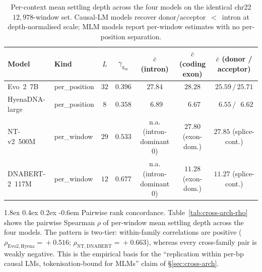 \documentclass{article}
\makeatletter
\renewcommand\paragraph{\@startsection{paragraph}{4}{\z@}%
  {1.8ex \@plus 0.4ex \@minus 0.2ex}%
  {-0.6em}%
{\normalfont\normalsize\bfseries}}
\theoremstyle{plain}
\theoremstyle{definition}
\theoremstyle{remark}
\makeatother
\begin{document}
\begin{table}[!htbp]
  \caption{Per-context mean settling depth across the four models on the
    identical chr22 $12{,}978$-window set. Causal-LM models recover
    donor/acceptor~$<$~intron at depth-normalised scale; MLM models
  report per-window estimates with no per-position separation.}
  \label{tab:cross-arch-context}
  \centering
  \footnotesize
  \setlength{\tabcolsep}{4pt}
  \begin{tabular}{@{}llccccc@{}}
    \toprule
    Model & Kind & $L$ & $\gamma_{q_{70}}$
    & $\bar c$ (intron) & $\bar c$ (coding exon)
    & $\bar c$ (donor / acceptor) \\
    \midrule
    Evo~2~7B            & per\_position & $32$ & $0.396$
    & $27.84$ & $28.28$ & $25.59 \,/\, 25.71$ \\
    HyenaDNA-large      & per\_position & $8$  & $0.358$
    & $\phantom{0}6.89$ & $\phantom{0}6.67$
    & $\phantom{0}6.55 \,/\, \phantom{0}6.62$ \\
    NT-v2~500M          & per\_window   & $29$ & $0.533$
    & n.a. (intron-dominant 0)
    & $27.80$ (exon-dom.) & $27.85$ (splice-cont.) \\
    DNABERT-2~117M      & per\_window   & $12$ & $0.677$
    & n.a. (intron-dominant 0)
    & $11.28$ (exon-dom.) & $11.27$ (splice-cont.) \\
    \bottomrule
  \end{tabular}
\end{table}

\paragraph{Pairwise rank concordance.} Table~\ref{tab:cross-arch-rho}
shows the pairwise Spearman $\rho$ of per-window mean settling depth
across the four models. The pattern is two-tier: within-family
correlations are positive ($\rho_{\mathrm{Evo2,Hyena}}\!=\!+0.516$;
$\rho_{\mathrm{NT,DNABERT}}\!=\!+0.663$), whereas every cross-family
pair is weakly negative. This is the empirical basis for the
``replication within per-bp causal LMs, tokenisation-bound for MLMs''
claim of \S\ref{sec:cross-arch}.
\end{document}
